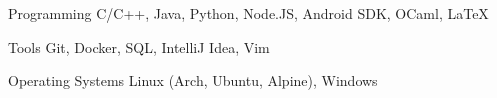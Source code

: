 

\begin{cvskills}

  \cvskill
    {Programming} %
    {C/C++, Java, Python, Node.JS, Android SDK, OCaml, LaTeX} %

  \cvskill
    {Tools} %
    {Git, Docker, SQL, IntelliJ Idea, Vim} %

  \cvskill
    {Operating Systems} %
    {Linux (Arch, Ubuntu, Alpine), Windows} %


\end{cvskills}
